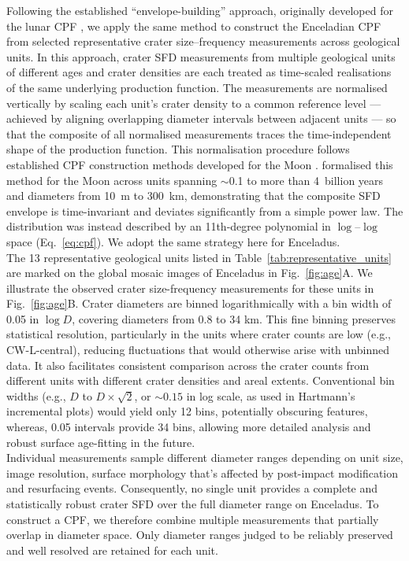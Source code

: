\documentclass[preprint,11pt,3p,times,authoryear]{elsarticle}
\begin{document}
Following the established ``envelope-building'' approach, originally developed for the lunar CPF \citep{Neukum1983}, we apply the same method to construct the Enceladian CPF from selected representative crater size–frequency measurements across geological units. 
In this approach, crater SFD measurements from multiple geological units of different ages and crater densities are each treated as time-scaled realisations of the same underlying production function. The measurements are normalised vertically by scaling each unit's crater density to a common reference level — achieved by aligning overlapping diameter intervals between adjacent units — so that the composite of all normalised measurements traces the time-independent shape of the production function.
This normalisation procedure follows established CPF construction methods developed for the Moon \citep{Neukum1975, Neukum1983, Werner2005}. 
\citet{Neukum1983} formalised this method for the Moon across units spanning ${\sim}$0.1 to more than 4~billion years and diameters from 10~m to 300~km, demonstrating that the composite SFD envelope is time-invariant and deviates significantly from a simple power law. The distribution was instead described by an 11th-degree polynomial in $\log$--$\log$ space (Eq.~\ref{eq:cpf}). We adopt the same strategy here for Enceladus.\\

The 13 representative geological units listed in Table~\ref{tab:representative_units} are marked on the global mosaic images of Enceladus in Fig.~\ref{fig:age}A. We illustrate the observed crater size-frequency measurements for these units in Fig.~\ref{fig:age}B.
Crater diameters are binned logarithmically with a bin width of 0.05 in $\log D$, covering diameters from 0.8 to 34 km. 
This fine binning preserves statistical resolution, particularly in the units where crater counts are low (e.g., CW-L-central), reducing fluctuations that would otherwise arise with unbinned data. It also facilitates consistent comparison across the crater counts from different units with different crater densities and areal extents.
Conventional bin widths (e.g., $D$ to $D \times \sqrt{2}$, or $\sim0.15$ in log scale, as used in Hartmann's incremental plots) would yield only 12 bins, potentially obscuring features, whereas, 0.05 intervals provide 34 bins, allowing more detailed analysis and robust surface age-fitting in the future.\\

Individual measurements sample different diameter ranges depending on unit size, image resolution, surface morphology that's affected by post-impact modification and resurfacing events. Consequently, no single unit provides a complete and statistically robust crater SFD over the full diameter range on Enceladus. To construct a CPF, we therefore combine multiple measurements that partially overlap in diameter space. Only diameter ranges judged to be reliably preserved and well resolved are retained for each unit.\\
\end{document}
